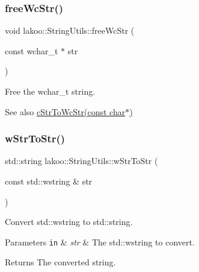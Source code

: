 \subsubsection{\texorpdfstring{free\+Wc\+Str()}{freeWcStr()}}
{\footnotesize\ttfamily void lakoo\+::\+String\+Utils\+::free\+Wc\+Str (\begin{DoxyParamCaption}\item[{const wchar\+\_\+t $\ast$}]{str }\end{DoxyParamCaption})}



Free the wchar\+\_\+t string. 

\begin{DoxySeeAlso}{See also}
\hyperlink{namespacelakoo_1_1_string_utils_aea1ebb73b8aa4f817d1473900cf16c29}{c\+Str\+To\+Wc\+Str(const char$\ast$)} 
\end{DoxySeeAlso}
\mbox{\label{namespacelakoo_1_1_string_utils_ac5f5ff19cad730bfb33924cd6cd8da15}} 
\subsubsection{\texorpdfstring{w\+Str\+To\+Str()}{wStrToStr()}}
{\footnotesize\ttfamily std\+::string lakoo\+::\+String\+Utils\+::w\+Str\+To\+Str (\begin{DoxyParamCaption}\item[{const std\+::wstring \&}]{str }\end{DoxyParamCaption})}



Convert std\+::wstring to std\+::string. 


\begin{DoxyParams}[1]{Parameters}
\mbox{\tt in}  & {\em str} & The std\+::wstring to convert. \\
\hline
\end{DoxyParams}
\begin{DoxyReturn}{Returns}
The converted string. 
\end{DoxyReturn}
\mbox{\label{namespacelakoo_1_1_string_utils_a13b1c55460bae1b1ebbab0164ebe722b}} 
